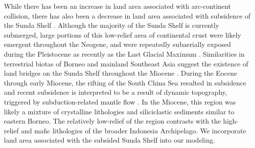 \documentclass[11pt,letterpaper]{article}
\begin{document}
While there has been an increase in land area associated with arc-continent collision, there has also been a decrease in land area associated with subsidence of the Sunda Shelf \citep{Sarr2019a}. Although the majority of the Sunda Shelf is currently submerged, large portions of this low-relief area of continental crust were likely emergent throughout the Neogene, and were repeatedly subaerially exposed during the Pleistocene as recently as the Last Glacial Maximum \citep{Halls2002a}. Similarities in terrestrial biotas of Borneo and mainland Southeast Asia suggest the existence of land bridges on the Sunda Shelf throughout the Miocene \citep{Moss1998a}. During the Eocene through early Miocene, the rifting of the South China Sea resulted in subsidence \citep{Morley2013a} and recent subsidence is interpreted to be a result of dynamic topography, triggered by subduction-related mantle flow \citep{Sarr2019a}. In the Miocene, this region was likely a mixture of crystalline lithologies and siliciclastic sediments similar to eastern Borneo. The relatively low-relief of the region contrasts with the high-relief and mafic lithologies of the broader Indonesia Archipelago. We incorporate land area associated with the subsided Sunda Shelf into our modeling.

\end{document}
